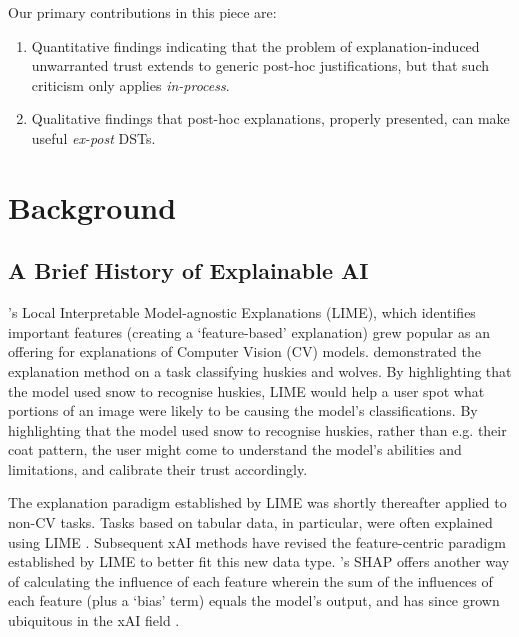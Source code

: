 Our primary contributions in this piece are:

\begin{enumerate}
    \item Quantitative findings indicating that the problem of explanation-induced unwarranted trust extends to generic post-hoc justifications, but that such criticism only applies \emph{in-process}.
    \item Qualitative findings that post-hoc explanations, properly presented, can make useful \emph{ex-post} DSTs.
\end{enumerate}

\section{Background}
\subsection{A Brief History of Explainable AI}\label{ssec:history}
\textcite{Ribeiro-et-al-lime}'s Local Interpretable Model-agnostic Explanations (LIME), which identifies important features (creating a `feature-based' explanation) grew popular as an offering for explanations of Computer Vision (CV) models. \textcite{Ribeiro-et-al-lime} demonstrated the explanation method on a task classifying huskies and wolves. By highlighting that the model used snow to recognise huskies, LIME would help a user spot what portions of an image were likely to be causing the model's classifications. By highlighting that the model used snow to recognise huskies, rather than e.g. their coat pattern, the user might come to understand the model's abilities and limitations, and calibrate their trust accordingly.

The explanation paradigm established by LIME was shortly thereafter applied to non-CV tasks. Tasks based on tabular data, in particular, were often explained using LIME \cite{Zerilli}. Subsequent xAI methods have revised the feature-centric paradigm established by LIME to better fit this new data type. \textcite{Lundberg-and-Lee}'s SHAP offers another way of calculating the influence of each feature wherein the sum of the influences of each feature (plus a `bias' term) equals the model's output, and has since grown ubiquitous in the xAI field \cite{Weerts-et-al-evaluation}.

